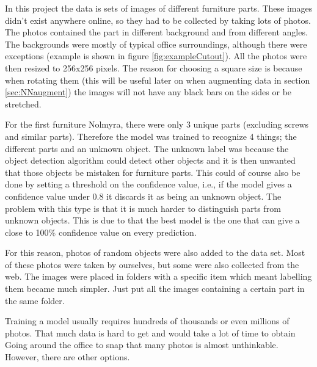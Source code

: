 In this project the data is sets of images of different furniture parts. These images didn't exist anywhere online, so they had to be collected by taking lots of photos. The photos contained the part in different background and from different angles. The backgrounds were mostly of typical office surroundings, although there were exceptions (example is shown in figure \ref{fig:exampleCutout}). All the photos were then resized to 256x256 pixels.
The reason for choosing a square size is because when rotating them
(this will be useful later on when augmenting data in section \ref{sec:NNaugment}) 
the images will not have any black bars on the sides or be stretched.

For the first furniture Nolmyra, there were only 3 unique parts (excluding screws and similar parts). Therefore the model was trained to recognize 4 things; the different parts and an unknown object. The unknown label was because the object detection algorithm could detect other objects and it is then unwanted that those objects be mistaken for furniture parts. This could of course also be done by setting a threshold on the confidence value, i.e., if the model gives a confidence value under 0.8 it discards it as being an unknown object. The problem with this type is that it is much harder to distinguish parts from unknown objects. This is due to that the best model is the one that can give a close to 100\% confidence value on every prediction.

For this reason, photos of random objects were also added to the data set. Most of these photos were taken by ourselves, but some were also collected from the web. The images were placed in folders with a specific item which meant labelling them became much simpler. Just put all the images containing a certain part in the same folder.

Training a model usually requires hundreds of thousands or even millions of photos. That much data is hard to get and would take a lot of time to obtain Going around the office to snap that many photos is almost unthinkable.
However, there are other options.

